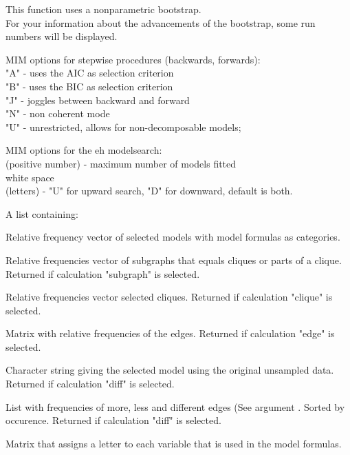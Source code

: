 \begin{Details}\relax
This function uses a nonparametric bootstrap.\\
For your information about the advancements of the bootstrap, some run numbers will be displayed.

MIM options for stepwise procedures (backwards, forwards):\\
"A" - uses the AIC as selection criterion\\
"B" - uses the BIC as selection criterion\\
"J" - joggles between backward and forward\\
"N" - non coherent mode\\
"U" - unrestricted, allows for non-decomposable models;

MIM options for the eh modelsearch:\\
(positive number) - maximum number of models fitted\\
white space\\
(letters) - "U" for upward search, "D" for downward, default is both.
\end{Details}
\begin{Value}
A list containing:
\begin{ldescription}
\item[\code{"bootstrapped models" }] Relative frequency vector of selected models with model formulas as categories. 
\item[\code{"bootstrapped subgraphs" }] Relative frequencies vector of subgraphs that equals cliques or parts of a clique.
Returned if calculation "subgraph" is selected.

\item[\code{"bootstrapped cliques" }] Relative frequencies vector selected cliques. Returned if calculation "clique" is selected.

\item[\code{"bootstrapped edges"}] Matrix with relative frequencies of the edges. Returned if calculation "edge" is selected. 
\item[\code{"original model"}] Character string giving the selected model using the original unsampled data. Returned if calculation "diff" is selected. 
\item[\code{"differences from original data set"}] List with frequencies of more, less and different edges (See argument .
Sorted by occurence.
Returned if calculation "diff" is selected. 
\item[\code{"variable names"}] Matrix that assigns a letter to each variable that is used in the model formulas. 
\end{ldescription}
\end{Value}
